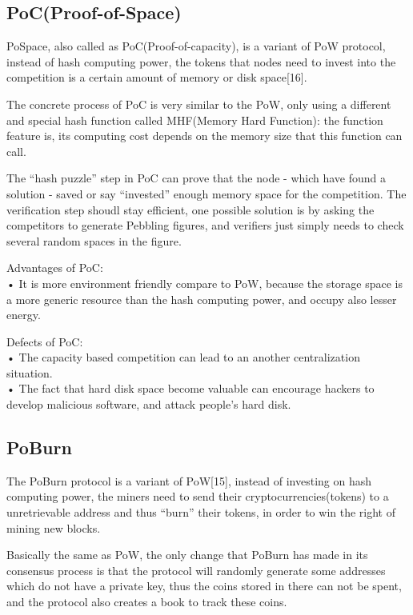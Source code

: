 \documentclass[doublespacing]{bmcart}
\begin{document}
\begin{CJK*}{UTF8}{gbsn}
\subsection{PoC(Proof-of-Space)}
	 
	PoSpace, also called as PoC(Proof-of-capacity), is a variant of PoW protocol, instead of hash computing power, the tokens that nodes need to invest into the competition is a certain amount of memory or disk space[16].
	 
	The concrete process of PoC is very similar to the PoW, only using a different and special hash function called MHF(Memory Hard Function): the function feature is, its computing cost depends on the memory size that this function can call.
	 
	The ``hash puzzle'' step in PoC can prove that the node - which have found a solution - saved or say ``invested'' enough memory space for the competition. The verification step shoudl stay efficient, one possible solution is by asking the competitors to generate Pebbling figures, and verifiers just simply needs to check several random spaces in the figure. 
	 
Advantages of PoC:
\\• It is more environment friendly compare to PoW, because the storage space is a more generic resource than the hash computing power, and occupy also lesser energy. 
	 
Defects of PoC:
\\• The capacity based competition can lead to an another centralization situation.
\\• The fact that hard disk space become valuable can encourage hackers to develop malicious software, and attack people's hard disk.  

\subsection{PoBurn}
		 
	The PoBurn protocol is a variant of PoW[15], instead of investing on hash computing power, the miners need to send their cryptocurrencies(tokens) to a unretrievable address and thus ``burn'' their tokens, in order to win the right of mining new blocks.
		 
	Basically the same as PoW, the only change that PoBurn has made in its consensus process is that the protocol will randomly generate some addresses which do not have a private key, thus the coins stored in there can not be spent, and the protocol also creates a book to track these coins. 
	 

\end{CJK*}
\end{document}
